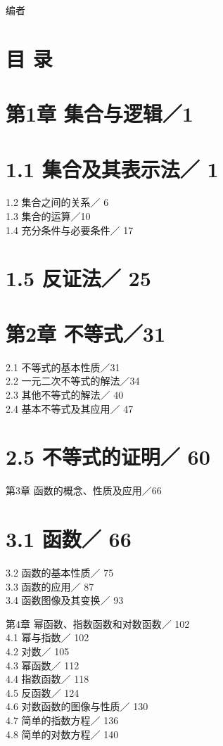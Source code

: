 \documentclass[10pt]{article}
\begin{document}
编者

\section*{目 录}
\section*{第1章 集合与逻辑／1}
\section*{1.1 集合及其表示法／ 1}
1.2 集合之间的关系／ 6\\
1.3 集合的运算／10\\
1.4 充分条件与必要条件／ 17

\section*{1.5 反证法／ 25}
\section*{第2章 不等式／31}
2.1 不等式的基本性质／31\\
2.2 一元二次不等式的解法／34\\
2.3 其他不等式的解法／ 40\\
2.4 基本不等式及其应用／ 47

\section*{2.5 不等式的证明／ 60}
第3章 函数的概念、性质及应用／66

\section*{3.1 函数／ 66}
3.2 函数的基本性质／ 75\\
3.3 函数的应用／ 87\\
3.4 函数图像及其变换／ 93

第4章 幂函数、指数函数和对数函数／ 102\\
4.1 幂与指数／ 102\\
4.2 对数／ 105\\
4.3 幂函数／ 112\\
4.4 指数函数／ 118\\
4.5 反函数／ 124\\
4.6 对数函数的图像与性质／ 130\\
4.7 简单的指数方程／ 136\\
4.8 简单的对数方程／ 140
\end{document}

